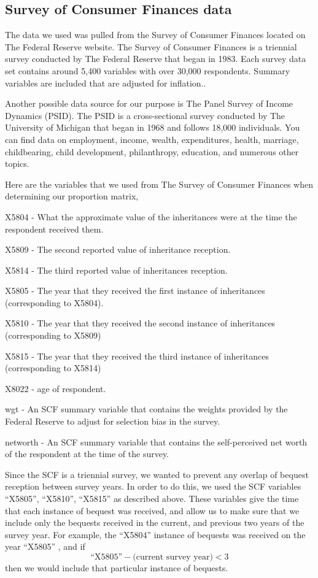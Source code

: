 \documentclass[letterpaper,12pt]{article}
\newcommand{\quotes}[1]{``#1''}
\theoremstyle{definition}
\begin{document}
\begin{spacing}{1.5}
\section{Survey of Consumer Finances data}\label{SecSCFdata}


The data we used was pulled from the Survey of Consumer Finances located on The Federal Reserve website. The Survey of Consumer Finances is a triennial survey conducted by The Federal Reserve that began in 1983. Each survey data set contains around 5,400 variables with over 30,000 respondents. Summary variables are included that are adjusted for inflation.\citet{FED}.

Another possible data source for our purpose is The Panel Survey of Income Dynamics (PSID). The PSID is a cross-sectional survey conducted by The University of Michigan that began in 1968 and follows 18,000 individuals. You can find data on employment, income, wealth, expenditures, health, marriage, childbearing, child development, philanthropy, education, and numerous other topics. \citet{UMich}

Here are the variables that we used from The Survey of Consumer Finances when determining our proportion matrix,

X5804 - What the approximate value of the inheritances were at the time the respondent received them. 

X5809 - The second reported value of inheritance reception.

X5814 - The third reported value of inheritances reception.

X5805 - The year that they received the first instance of inheritances (corresponding to X5804).

X5810 - The year that they received the second instance of inheritances (corresponding to X5809)

X5815 - The year that they received the third instance of inheritances (corresponding to X5814)

X8022 - age of respondent.

wgt - An SCF summary variable that contains the weights provided by the Federal Reserve to adjust for selection bias in the survey.

networth - An SCF summary variable that contains the self-perceived net worth of the respondent at the time of the survey. 


Since the SCF is a triennial survey, we wanted to prevent any overlap of bequest reception between survey years. In order to do this, we used the SCF variables \quotes{X5805}, \quotes{X5810}, \quotes{X5815} as described above. These variables give the time that each instance of bequest was received, and allow us to make sure that we include only the bequests received in the current, and previous two years of the survey year. For example, the \quotes{X5804} instance of bequests was received on the year \quotes{X5805} , and if 
\[\text{\quotes{X5805}} - \text{(current~survey~year)} <3\]
 then we would include that particular instance of bequests.


\end{spacing}
\end{document}
